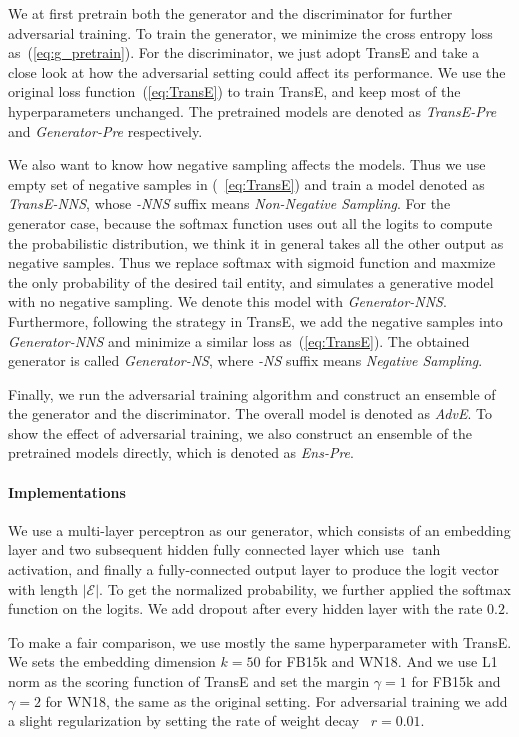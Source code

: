 \documentclass[twocolumn,a4paper,10pt,preprint,3p]{elsarticle}
\begin{document}
We at first pretrain both the generator and the discriminator for further adversarial training. To train the generator, we minimize the cross entropy loss as~(\ref{eq:g_pretrain}). For the discriminator, we just adopt TransE and take a close look at how the adversarial setting could affect its performance. We use the original loss function~(\ref{eq:TransE}) to train TransE, and keep most of the hyperparameters unchanged. The pretrained models are denoted as \emph{TransE-Pre} and \emph{Generator-Pre} respectively.

We also want to know how negative sampling affects the models. Thus we use empty set of negative samples in (~\ref{eq:TransE}) and train a model denoted as \emph{TransE-NNS}, whose \emph{-NNS} suffix means \emph{Non-Negative Sampling}. For the generator case, because the softmax function uses out all the logits to compute the probabilistic distribution, we think it in general takes all the other output as negative samples. Thus we replace softmax with sigmoid function and maxmize the only probability of the desired tail entity, and simulates a generative model with no negative sampling. We denote this model with \emph{Generator-NNS}. Furthermore, following the strategy in TransE, we add the negative samples into \emph{Generator-NNS} and  minimize a similar loss as~(\ref{eq:TransE}). The obtained generator is called \emph{Generator-NS}, where \emph{-NS} suffix means \emph{Negative Sampling}.

Finally, we run the adversarial training algorithm and construct an ensemble of the generator and the discriminator. The overall model is denoted as \emph{AdvE}. To show the effect of adversarial training, we also construct an ensemble of the pretrained models directly, which is denoted as \emph{Ens-Pre}.

\paragraph{Implementations} We use a multi-layer perceptron as our generator, which consists of an embedding layer and two subsequent hidden fully connected layer which use $\tanh$ activation, and finally a fully-connected output layer to produce the logit vector with length $\lvert\mathcal{E} \rvert$. To get the normalized probability, we further applied the softmax function on the logits. We add dropout after every hidden layer with the rate $0.2$.

To make a fair comparison, we use mostly the same hyperparameter with TransE. We sets the embedding dimension $k=50$ for FB15k and WN18. And we use L1 norm as the scoring function of TransE and set the margin $\gamma=1$ for FB15k and $\gamma=2$ for WN18, the same as the original setting.
For adversarial training we add a slight regularization by setting the rate of weight decay~\cite{weight_decay} $r=0.01$.
\end{document}
